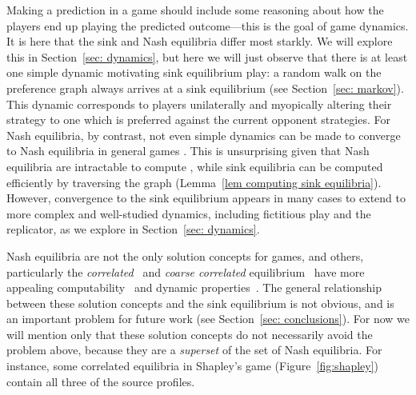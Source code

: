 \documentclass[preprint,authoryear]{elsarticle}
\begin{document}
Making a prediction in a game should include some reasoning about how the players end up playing the predicted outcome---this is the goal of game dynamics. %
It is here that the sink and Nash equilibria differ most starkly. We will explore this in Section~\ref{sec: dynamics}, but here we will just observe that there is at least one simple dynamic motivating sink equilibrium play: a random walk on the preference graph always arrives at a sink equilibrium (see Section~\ref{sec: markov}). This dynamic corresponds to players unilaterally and myopically altering their strategy to one which is preferred against the current opponent strategies. For Nash equilibria, by contrast, not even simple dynamics can be made to converge to Nash equilibria in general games \citep{hart_uncoupled_2003,milionis_impossibility_2023}. This is unsurprising given that Nash equilibria are intractable to compute \citep{daskalakis_complexity_2009}, while sink equilibria can be computed efficiently by traversing the graph (Lemma~\ref{lem computing sink equilibria}).
However, convergence to the sink equilibrium appears in many cases to extend to more complex and well-studied dynamics, including fictitious play and the replicator, as we explore in Section~\ref{sec: dynamics}.

Nash equilibria are not the only solution concepts for games, and others, particularly the \emph{correlated}~\citep{aumann1987correlated} and \emph{coarse correlated} equilibrium~\citep{hannan1957approximation} have more appealing computability~\citep{papadimitriou_computing_2008} and dynamic properties~\citep{cesa2006prediction}. The general relationship between these solution concepts and the sink equilibrium is not obvious, and is an important problem for future work (see Section~\ref{sec: conclusions}). For now we will mention only that these solution concepts do not necessarily avoid the problem above, because they are a \emph{superset} of the set of Nash equilibria. For instance, some correlated equilibria in Shapley's game (Figure~\ref{fig:shapley}) contain all three of the source profiles.
\end{document}
